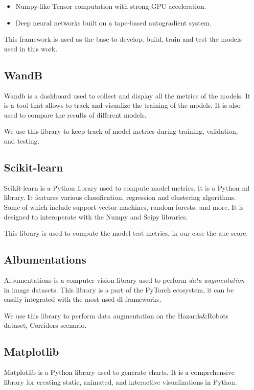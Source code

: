     \begin{itemize}
        \item Numpy-like Tensor computation with strong GPU acceleration.
        \item Deep neural networks built on a tape-based autogradient system.
    \end{itemize}
    
    This framework is used as the base to develop, build, train and test the models used in this work.

    \subsection{WandB}
    Wandb \cite{wandb} is a dashboard used to collect and display all the metrics of the models. It is a tool that allows to track and visualize the training of the models. It is also used to compare the results of different models. 
    
    We use this library to keep track of model metrics during training, validation, and testing.

    \subsection{Scikit-learn}
    Scikit-learn is a Python library used to compute model metrics. It is a Python \acrfull{ml} library. It features various classification, regression and clustering algorithms. Some of which include support vector machines, random forests, and more. It is designed to interoperate with the Numpy and Scipy libraries.
    
    This library is used to compute the model test metrics, in our case the \acrfull{auc} score.
    
    \subsection{Albumentations}
    Albumentations \cite{albumentation} is a computer vision library used to perform \emph{data augmentation} in image datasets. This library is a part of the PyTorch ecosystem, it can be easilly integrated with the most used \acrshort{dl} frameworks.
    
    We use this library to perform data augmentation on the Hazards\&Robots dataset, Corridors scenario.
    
    \subsection{Matplotlib}
    Matplotlib is a Python library used to generate charts. It is a comprehensive library for creating static, animated, and interactive visualizations in Python.

